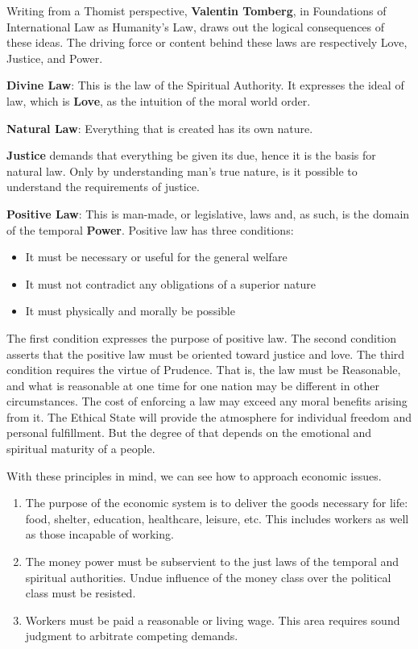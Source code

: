 Writing from a Thomist perspective, \textbf{Valentin Tomberg}, in Foundations of International Law as Humanity's Law, draws out the logical consequences of these ideas. The driving force or content behind these laws are respectively Love, Justice, and Power.

\textbf{Divine Law}: This is the law of the Spiritual Authority. It expresses the ideal of law, which is \textbf{Love}, as the intuition of the moral world order.

\textbf{Natural Law}: Everything that is created has its own nature.

\textbf{Justice} demands that everything be given its due, hence it is the basis for natural law. Only by understanding man's true nature, is it possible to understand the requirements of justice.

\textbf{Positive Law}: This is man-made, or legislative, laws and, as such, is the domain of the temporal \textbf{Power}. Positive law has three conditions:

\begin{itemize}


\item It must be necessary or useful for the general welfare

\item It must not contradict any obligations of a superior nature

\item It must physically and morally be possible
\end{itemize}


The first condition expresses the purpose of positive law. The second condition asserts that the positive law must be oriented toward justice and love. The third condition requires the virtue of Prudence. That is, the law must be Reasonable, and what is reasonable at one time for one nation may be different in other circumstances. The cost of enforcing a law may exceed any moral benefits arising from it. The Ethical State will provide the atmosphere for individual freedom and personal fulfillment. But the degree of that depends on the emotional and spiritual maturity of a people.

With these principles in mind, we can see how to approach economic issues.

\begin{enumerate}


\item The purpose of the economic system is to deliver the goods necessary for life: food, shelter, education, healthcare, leisure, etc. This includes workers as well as those incapable of working.

\item The money power must be subservient to the just laws of the temporal and spiritual authorities. Undue influence of the money class over the political class must be resisted.

\item Workers must be paid a reasonable or living wage. This area requires sound judgment to arbitrate competing demands.
\end{enumerate}


